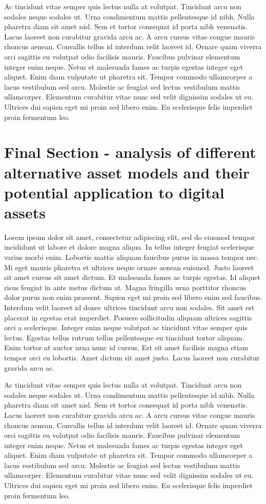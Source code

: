 \documentclass{ledger}
\begin{document}
Ac tincidunt vitae semper quis lectus nulla at volutpat. Tincidunt arcu non sodales neque sodales ut. Urna condimentum mattis pellentesque id nibh. Nulla pharetra diam sit amet nisl. Sem et tortor consequat id porta nibh venenatis. Lacus laoreet non curabitur gravida arcu ac. A arcu cursus vitae congue mauris rhoncus aenean. Convallis tellus id interdum velit laoreet id. Ornare quam viverra orci sagittis eu volutpat odio facilisis mauris. Faucibus pulvinar elementum integer enim neque. Netus et malesuada fames ac turpis egestas integer eget aliquet. Enim diam vulputate ut pharetra sit. Tempor commodo ullamcorper a lacus vestibulum sed arcu. Molestie ac feugiat sed lectus vestibulum mattis ullamcorper. Elementum curabitur vitae nunc sed velit dignissim sodales ut eu. Ultrices dui sapien eget mi proin sed libero enim. Eu scelerisque felis imperdiet proin fermentum leo.\newline



\section{Final Section - analysis of different alternative asset models and their potential application to digital assets}

Lorem ipsum dolor sit amet, consectetur adipiscing elit, sed do eiusmod tempor incididunt ut labore et dolore magna aliqua. In tellus integer feugiat scelerisque varius morbi enim. Lobortis mattis aliquam faucibus purus in massa tempor nec. Mi eget mauris pharetra et ultrices neque ornare aenean euismod. Justo laoreet sit amet cursus sit amet dictum. Et malesuada fames ac turpis egestas. Id aliquet risus feugiat in ante metus dictum at. Magna fringilla urna porttitor rhoncus dolor purus non enim praesent. Sapien eget mi proin sed libero enim sed faucibus. Interdum velit laoreet id donec ultrices tincidunt arcu non sodales. Sit amet est placerat in egestas erat imperdiet. Posuere sollicitudin aliquam ultrices sagittis orci a scelerisque. Integer enim neque volutpat ac tincidunt vitae semper quis lectus. Egestas tellus rutrum tellus pellentesque eu tincidunt tortor aliquam. Enim tortor at auctor urna nunc id cursus. Est sit amet facilisis magna etiam tempor orci eu lobortis. Amet dictum sit amet justo. Lacus laoreet non curabitur gravida arcu ac.

Ac tincidunt vitae semper quis lectus nulla at volutpat. Tincidunt arcu non sodales neque sodales ut. Urna condimentum mattis pellentesque id nibh. Nulla pharetra diam sit amet nisl. Sem et tortor consequat id porta nibh venenatis. Lacus laoreet non curabitur gravida arcu ac. A arcu cursus vitae congue mauris rhoncus aenean. Convallis tellus id interdum velit laoreet id. Ornare quam viverra orci sagittis eu volutpat odio facilisis mauris. Faucibus pulvinar elementum integer enim neque. Netus et malesuada fames ac turpis egestas integer eget aliquet. Enim diam vulputate ut pharetra sit. Tempor commodo ullamcorper a lacus vestibulum sed arcu. Molestie ac feugiat sed lectus vestibulum mattis ullamcorper. Elementum curabitur vitae nunc sed velit dignissim sodales ut eu. Ultrices dui sapien eget mi proin sed libero enim. Eu scelerisque felis imperdiet proin fermentum leo.
\end{document}
